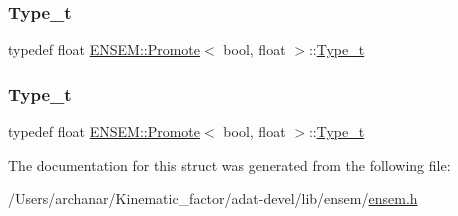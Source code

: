 \mbox{\label{structENSEM_1_1Promote_3_01bool_00_01float_01_4_aac75d1edfea4b854f38644f46a79ad71}} 
\subsubsection{\texorpdfstring{Type\_t}{Type\_t}\hspace{0.1cm}{\footnotesize\ttfamily [2/3]}}
{\footnotesize\ttfamily typedef float \mbox{\hyperlink{structENSEM_1_1Promote}{E\+N\+S\+E\+M\+::\+Promote}}$<$ bool, float $>$\+::\mbox{\hyperlink{structENSEM_1_1Promote_3_01bool_00_01float_01_4_aac75d1edfea4b854f38644f46a79ad71}{Type\+\_\+t}}}

\mbox{\label{structENSEM_1_1Promote_3_01bool_00_01float_01_4_aac75d1edfea4b854f38644f46a79ad71}} 
\subsubsection{\texorpdfstring{Type\_t}{Type\_t}\hspace{0.1cm}{\footnotesize\ttfamily [3/3]}}
{\footnotesize\ttfamily typedef float \mbox{\hyperlink{structENSEM_1_1Promote}{E\+N\+S\+E\+M\+::\+Promote}}$<$ bool, float $>$\+::\mbox{\hyperlink{structENSEM_1_1Promote_3_01bool_00_01float_01_4_aac75d1edfea4b854f38644f46a79ad71}{Type\+\_\+t}}}



The documentation for this struct was generated from the following file\+:\begin{DoxyCompactItemize}
\item 
/\+Users/archanar/\+Kinematic\+\_\+factor/adat-\/devel/lib/ensem/\mbox{\hyperlink{adat-devel_2lib_2ensem_2ensem_8h}{ensem.\+h}}\end{DoxyCompactItemize}

